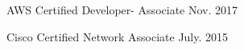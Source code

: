 

\begin{cventries}

  \cvcert
    {AWS Certified Developer- Associate} %
    {Nov. 2017} %

  \cvcert
    {Cisco Certified Network Associate} %
    {July. 2015} %

\end{cventries}

